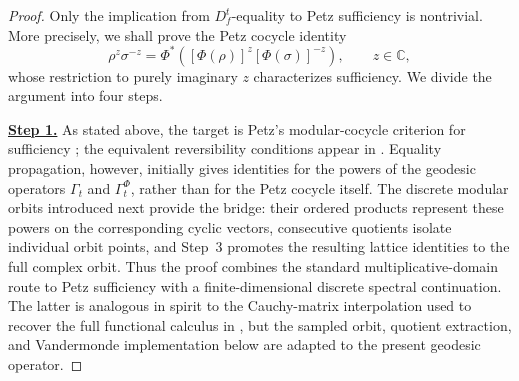 \documentclass[11pt]{article}
\theoremstyle{remark}
\newcommand{\1}{\mathbbm{1}}
\begin{document}
\begin{proof}
Only the implication from $D_f^t$-equality to Petz sufficiency is
nontrivial.  More precisely, we shall prove the Petz cocycle identity
\begin{equation}
 \rho^z\sigma^{-z}
 =\Phi^*\!\left(
 [\Phi(\rho)]^z[\Phi(\sigma)]^{-z}\right),
 \qquad z\in\mathbb C,
 \label{eq:consolidated-proof-target-Petz-cocycle}
\end{equation}
whose restriction to purely imaginary $z$ characterizes sufficiency.
We divide the argument into four steps.

\smallskip
\noindent\underline{\textbf{Step 1.}}\enspace
As stated above, the target is Petz's modular-cocycle criterion for sufficiency
\cite[Theorem~2]{petz2003monotonicity}; the equivalent
reversibility conditions appear in
\cite[Theorem~3.18(i),(vi)]{hiai2017different}.  Equality propagation,
however, initially gives identities for the powers of the geodesic
operators $\Gamma_t$ and $\Gamma_t^\Phi$, rather than for the Petz
cocycle itself.  The discrete modular orbits
introduced next provide the bridge: their ordered products represent
these powers on the corresponding cyclic vectors, consecutive
quotients isolate individual orbit points, and Step~3 promotes the
resulting lattice identities to the full complex orbit.  Thus the
proof combines the standard multiplicative-domain route to Petz
sufficiency with a finite-dimensional discrete spectral continuation.
The latter is analogous in spirit to the Cauchy-matrix interpolation
used to recover the full functional calculus in
\cite[Lemma~5.2 and Theorem~5.1]{hiai2011quantum}, but the sampled
orbit, quotient extraction, and Vandermonde implementation below are
adapted to the present geodesic operator.


\end{proof}
\end{document}

